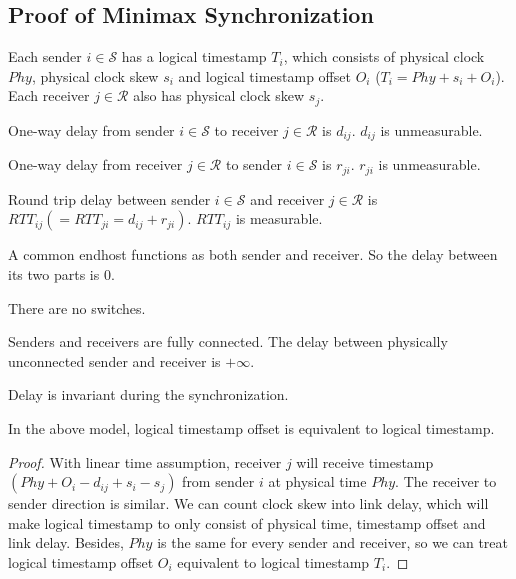 \subsection{Proof of Minimax Synchronization}
\label{appx:minimax}

\begin{notation}
	Each sender $i\in\mathcal{S}$ has a logical timestamp $T_i$, which consists of physical clock $Phy$, physical clock skew $s_i$ and logical timestamp offset $O_i$ ($T_i = Phy+s_i+O_i$).
	Each receiver $j \in \mathcal{R}$ also has physical clock skew $s_j$.
\end{notation}\begin{notation}
	One-way delay from sender $i \in \mathcal{S}$ to receiver $j \in \mathcal{R}$ is $d_{ij}$.
	$d_{ij}$ is unmeasurable.
\end{notation}
\begin{notation}
	One-way delay from receiver $j \in \mathcal{R}$ to sender $i \in \mathcal{S}$ is $r_{ji}$.
	$r_{ji}$ is unmeasurable.
\end{notation}
\begin{notation}
	Round trip delay between sender $i \in \mathcal{S}$ and receiver $j \in \mathcal{R}$ is $RTT_{ij}( = RTT_{ji} = d_{ij} + r_{ji})$.
	$RTT_{ij}$ is measurable.
\end{notation}
\begin{note}
	A common endhost functions as both sender and receiver.
	So the delay between its two parts is $0$.
\end{note}
\begin{assump}
	There are no switches.
\end{assump}
\begin{assump}
	Senders and receivers are fully connected.
	The delay between physically unconnected sender and receiver is $+\infty$.
\end{assump}
\begin{assump}
	Delay is invariant during the synchronization.
\end{assump}
\begin{lemma}\label{proof:ts2offset}
	In the above model, logical timestamp offset is equivalent to logical timestamp.
\end{lemma}
\begin{proof}
	With linear time assumption, receiver $j$ will receive timestamp $(Phy+O_i-d_{ij}+s_i-s_j)$ from sender $i$ at physical time $Phy$.
	The receiver to sender direction is similar.
	We can count clock skew into link delay, which will make logical timestamp to only consist of physical time, timestamp offset and link delay.
	Besides, $Phy$ is the same for every sender and receiver, so we can treat logical timestamp offset $O_i$ equivalent to logical timestamp $T_i$.
\end{proof}
